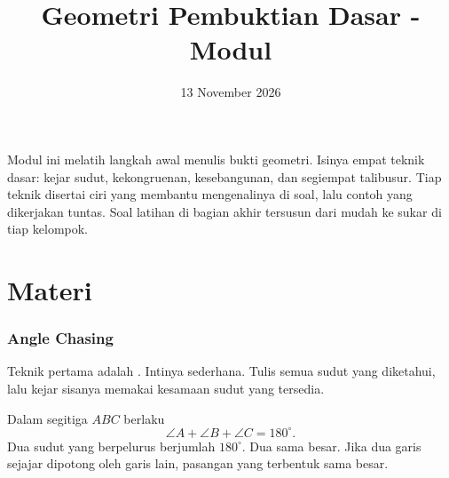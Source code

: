 \documentclass[12pt]{scrartcl}
\title{Geometri Pembuktian Dasar - Modul}
\date{13 November 2026}
\begin{document}
\maketitle

\renewcommand*\contentsname{Daftar Isi}
\tableofcontents

\newpage

Modul ini melatih langkah awal menulis bukti geometri. Isinya empat teknik
dasar: kejar sudut, kekongruenan, kesebangunan, dan segiempat talibusur.
Tiap teknik disertai ciri yang membantu mengenalinya di soal, lalu contoh
yang dikerjakan tuntas. Soal latihan di bagian akhir tersusun dari mudah
ke sukar di tiap kelompok.

\part*{Materi}

\section{Angle Chasing}

Teknik pertama adalah . Intinya
sederhana. Tulis semua sudut yang diketahui, lalu kejar sisanya memakai
kesamaan sudut yang tersedia.

\begin{fact}
Dalam segitiga $ABC$ berlaku
\[ \angle A + \angle B + \angle C = 180^\circ. \]
Dua sudut yang berpelurus berjumlah $180^\circ$.
Dua  sama besar.
Jika dua garis sejajar dipotong oleh garis lain, pasangan
 yang terbentuk sama besar.
\end{fact}
\end{document}
